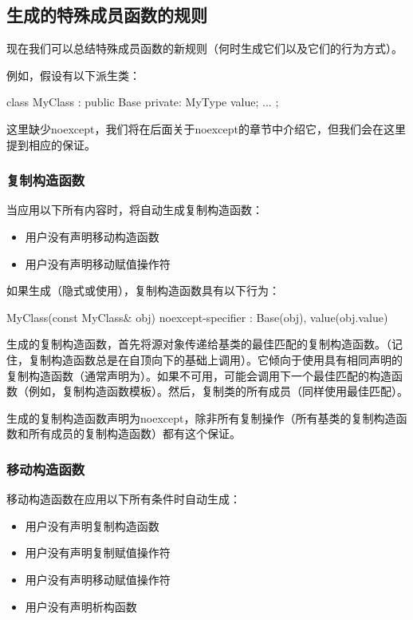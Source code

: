 \subsection{生成的特殊成员函数的规则}

现在我们可以总结特殊成员函数的新规则（何时生成它们以及它们的行为方式）。

例如，假设有以下派生类：

\begin{cppcode}
class MyClass : public Base
{
private:
	MyType value;
	...
};
\end{cppcode}

这里缺少noexcept，我们将在后面关于noexcept的章节中介绍它，但我们会在这里提到相应的保证。

\subsubsection{复制构造函数}

当应用以下所有内容时，将自动生成复制构造函数：

\begin{itemize}
	\item 用户没有声明移动构造函数
	\item 用户没有声明移动赋值操作符
\end{itemize}

如果生成（隐式或使用），复制构造函数具有以下行为：

\begin{cppcode}
MyClass(const MyClass& obj) noexcept-specifier
: Base(obj), value(obj.value) {
}
\end{cppcode}

生成的复制构造函数，首先将源对象传递给基类的最佳匹配的复制构造函数。（记住，复制构造函数总是在自顶向下的基础上调用）。它倾向于使用具有相同声明的复制构造函数（通常声明为）。如果不可用，可能会调用下一个最佳匹配的构造函数（例如，复制构造函数模板）。然后，复制类的所有成员（同样使用最佳匹配）。

生成的复制构造函数声明为noexcept，除非所有复制操作（所有基类的复制构造函数和所有成员的复制构造函数）都有这个保证。

\subsubsection{移动构造函数}

移动构造函数在应用以下所有条件时自动生成：

\begin{itemize}
	\item 用户没有声明复制构造函数
	\item 用户没有声明复制赋值操作符
	\item 用户没有声明移动赋值操作符
	\item 用户没有声明析构函数
\end{itemize}

